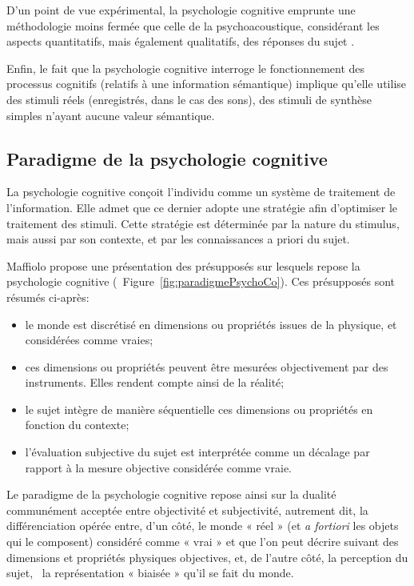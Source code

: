 D'un point de vue expérimental, la psychologie cognitive emprunte une méthodologie moins fermée que celle de la psychoacoustique, considérant les aspects quantitatifs, mais également qualitatifs, des réponses du sujet \citep{maffiolo_marieParis_1997,maffiolo_caracterisation_1999}. 

Enfin, le fait que la psychologie cognitive interroge le fonctionnement des processus cognitifs (relatifs à une information sémantique) implique qu'elle utilise des stimuli réels (enregistrés, dans le cas des sons), des stimuli de synthèse simples n'ayant aucune valeur sémantique.

\subsection{Paradigme de la psychologie cognitive}
\label{sec:ch3_psychoCog}

La psychologie cognitive conçoit l'individu comme un système de traitement de l'information. Elle admet que ce dernier adopte une stratégie afin d'optimiser le traitement des stimuli. Cette stratégie est déterminée par la nature du stimulus, mais aussi par son contexte, et par les connaissances a priori du sujet.

Maffiolo \citep{maffiolo_caracterisation_1999} propose une présentation des présupposés sur lesquels repose la psychologie cognitive (\cf~Figure~\ref{fig:paradigmePsychoCo}). Ces présupposés sont résumés ci-après:

\begin{itemize}
\item le monde est discrétisé en dimensions ou propriétés issues de la physique, et considérées comme vraies;
\item ces dimensions ou propriétés peuvent être mesurées objectivement par des instruments. Elles rendent compte ainsi de la réalité;
\item le sujet intègre de manière séquentielle ces dimensions ou propriétés en fonction du contexte;
\item l'évaluation subjective du sujet est interprétée comme un décalage par rapport à la mesure objective considérée comme vraie.
\end{itemize}

Le paradigme de la psychologie cognitive repose ainsi sur la dualité communément acceptée entre objectivité et subjectivité, autrement dit, la différenciation opérée entre, d'un côté, le monde « réel » (et \emph{a fortiori} les objets qui le composent) considéré comme « vrai » et que l'on peut décrire suivant des dimensions et propriétés physiques objectives, et, de l'autre côté, la perception du sujet, \ie~la représentation « biaisée » qu'il se fait du monde.

